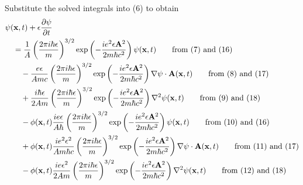 \documentclass[12pt]{article}
\begin{document}
Substitute the solved integrals into (6) to obtain
\begin{align*}
&\psi(\mathbf{x},t)+\epsilon\frac{\partial\psi}{\partial t}
\\
&\quad{}=\frac{1}{A}\left(\frac{2\pi i\hbar\epsilon}{m}\right)^{3/2}
\exp\left(-\frac{ie^2\epsilon\mathbf A^2}{2m\hbar c^2}\right)
\psi(\mathbf x,t)
\tag*{\text{from (7) and (16)}}
\\
&\qquad-\frac{e\epsilon}{Amc}
\left(\frac{2\pi i\hbar\epsilon}{m}\right)^{3/2}
\exp\left(-\frac{ie^2\epsilon\mathbf A^2}{2m\hbar c^2}\right)
\nabla\psi\cdot\mathbf A(\mathbf x,t)
\tag*{\text{from (8) and (17)}}
\\
&\qquad{}+\frac{i\hbar\epsilon}{2Am}\left(\frac{2\pi i\hbar\epsilon}{m}\right)^{3/2}
\exp\left(-\frac{ie^2\epsilon\mathbf A^2}{2m\hbar c^2}\right)
\nabla^2\psi(\mathbf x,t)
\tag*{\text{from (9) and (18)}}
\\
&\qquad{}-\phi(\mathbf x,t)
\frac{ie\epsilon}{A\hbar}
\left(\frac{2\pi i\hbar\epsilon}{m}\right)^{3/2}
\exp\left(-\frac{ie^2\epsilon\mathbf A^2}{2m\hbar c^2}\right)
\psi(\mathbf x,t)
\tag*{\text{from (10) and (16)}}
\\
&\qquad{}+\phi(\mathbf x,t)
\frac{ie^2\epsilon^2}{Am\hbar c}
\left(\frac{2\pi i\hbar\epsilon}{m}\right)^{3/2}
\exp\left(-\frac{ie^2\epsilon\mathbf A^2}{2m\hbar c^2}\right)
\nabla\psi\cdot\mathbf A(\mathbf x,t)
\tag*{\text{from (11) and (17)}}
\\
&\qquad{}-\phi(\mathbf x,t)
\frac{ie\epsilon^2}{2Am}\left(\frac{2\pi i\hbar\epsilon}{m}\right)^{3/2}
\exp\left(-\frac{ie^2\epsilon\mathbf A^2}{2m\hbar c^2}\right)
\nabla^2\psi(\mathbf x,t)
\tag*{\text{from (12) and (18)}}
\end{align*}
\end{document}
